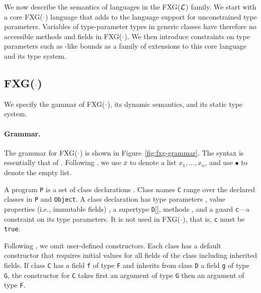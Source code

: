 \newcommand\wj[2]{{#1} \vdash_{\cal W}{#2}}
\newcommand\cdecl{{\tt class}~{\tt C}[\tbar{X}]\{{\tt c}\}(\tbar{f}\ty\tbar{F})~{\tt extends}~{\tt D}[\tbar{E}]~\{~\tbar{M}~\}}
\newcommand\msign[5]{{\tt m}[\tbar{#1}](\tbar{#2}\ty\tbar{#3})\{{\tt #4}\}\ty{\tt #5}}
\newcommand\minst[6]{\msign{#1}{#2}{#3}{#4}{#5}={\tt #6}}
\newcommand\mdecl[6]{{\tt def}~\minst{#1}{#2}{#3}{#4}{#5}{#6}}
\newcommand\FXGL[1]{{\sf FXG($\cal #1$)}}
\newcommand{\vdashQ}{\vdash_{\cal Q}}
\newcommand{\Dom}{{\sf Dom}}
\newcommand{\Img}{{\sf Img}}

We now describe the semantics of languages in the \FXGL{L} family. We start with a core \FXGL{\cdot} language that adds to the \FX language support for unconstrained type parameters. Variables of type-parameter types in generic classes have therefore no accessible methods and fields in \FXGL{\cdot}. We then introduce constraints on type parameters such as \FGJ-like bounds as a family of extensions to this core language and its type system.


\subsection{\FXGL{\cdot}}

We specify the gammar of \FXGL{\cdot}, its dynamic semantics, and its static type system.

\paragraph{Grammar.} The grammar for \FXGL{\cdot} is shown in Figure~\ref{fig:fxg-grammar}. The syntax is essentially that of \FGJ. Following \FJ{}, we use $\bar{x}$ to denote a list $x_1, \dots, x_n$, and use $\bullet$ to denote the empty list.

A program {\tt P} is a set of class declarations . Class names {\tt C} range over the declared classes in {\tt P} and {\tt Object}. A class declaration has type parameters , value properties (i.e., immutable fields) , a supertype {\tt D}[], methods , and a guard {\tt c}---a constraint on its type parameters. It is not used in \FXGL{\cdot}, that is, {\tt c} must be {\tt true}.

Following \FJ{}, we omit user-defined constructors. Each class has a default constructor that requires initial values for all fields of the class including inherited fields. If class {\tt C} has a field {\tt f} of type {\tt F} and inherits from class {\tt D} a field {\tt g} of type {\tt G}, the constructor for {\tt C} takes first an argument of type {\tt G} then an argument of type {\tt F}.

